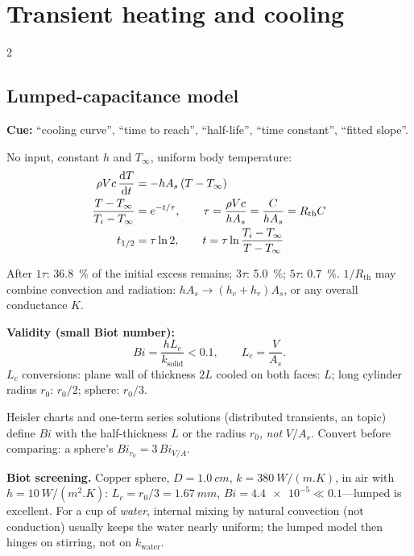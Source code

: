 \section{Transient heating and cooling}\label{sec:transient}
\begin{multicols}{2}
\subsection{Lumped-capacitance model}\label{sec:lumped}
\CORE{} \textbf{Cue:} ``cooling curve'', ``time to reach'', ``half-life'', ``time constant'', ``fitted slope''.
\begin{formulabox}No input, constant $h$ and $T_\infty$, uniform body temperature:
\begin{align}
\rho Vc\,\frac{\mathrm{d} T}{\mathrm{d} t} &= -hA_s\,(T-T_\infty) \notag\\
\frac{T-T_\infty}{T_i-T_\infty} &= e^{-t/\tau},\qquad \tau=\frac{\rho Vc}{hA_s}=\frac{C}{hA_s}=R_{\text{th}}C \label{F:transfer:lumped}\\
t_{1/2} &= \tau\ln2,\qquad t=\tau\ln\frac{T_i-T_\infty}{T-T_\infty} \label{F:transfer:halflife}
\end{align}
\end{formulabox}
After $1\tau$: \SI{36.8}{\percent} of the initial excess remains; $3\tau$: \SI{5.0}{\percent}; $5\tau$: \SI{0.7}{\percent}. $1/R_{\text{th}}$ may combine convection and radiation: $hA_s\to(h_c+h_r)A_s$, or any overall conductance $K$.

\textbf{Validity (small Biot number):}
\begin{equation}
Bi=\frac{hL_c}{k_{\text{solid}}}<0.1,\qquad L_c=\frac{V}{A_s}. \label{F:transfer:biot}
\end{equation}
$L_c$ conversions: plane wall of thickness $2L$ cooled on both faces: $L$; long cylinder radius $r_0$: $r_0/2$; sphere: $r_0/3$.

\begin{trapbox}Heisler charts and one-term series solutions (distributed transients, an \EXT{} topic) define $Bi$ with the half-thickness $L$ or the radius $r_0$, \emph{not} $V/A_s$. Convert before comparing: a sphere's $Bi_{r_0}=3\,Bi_{V/A}$.\end{trapbox}

\begin{demobox}\textbf{Biot screening.} Copper sphere, $D=\SI{1.0}{cm}$, $k=\SI{380}{W/(m.K)}$, in air with $h=\SI{10}{W/(m^2.K)}$: $L_c=r_0/3=\SI{1.67}{mm}$, $Bi=\num{4.4e-5}\ll0.1$---lumped is excellent. For a cup of \emph{water}, internal mixing by natural convection (not conduction) usually keeps the water nearly uniform; the lumped model then hinges on stirring, not on $k_{\text{water}}$.\end{demobox}


\end{multicols}
